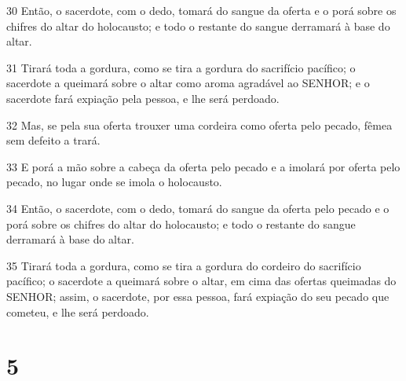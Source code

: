 \par 30 Então, o sacerdote, com o dedo, tomará do sangue da oferta e o porá sobre os chifres do altar do holocausto; e todo o restante do sangue derramará à base do altar.
\par 31 Tirará toda a gordura, como se tira a gordura do sacrifício pacífico; o sacerdote a queimará sobre o altar como aroma agradável ao SENHOR; e o sacerdote fará expiação pela pessoa, e lhe será perdoado.
\par 32 Mas, se pela sua oferta trouxer uma cordeira como oferta pelo pecado, fêmea sem defeito a trará.
\par 33 E porá a mão sobre a cabeça da oferta pelo pecado e a imolará por oferta pelo pecado, no lugar onde se imola o holocausto.
\par 34 Então, o sacerdote, com o dedo, tomará do sangue da oferta pelo pecado e o porá sobre os chifres do altar do holocausto; e todo o restante do sangue derramará à base do altar.
\par 35 Tirará toda a gordura, como se tira a gordura do cordeiro do sacrifício pacífico; o sacerdote a queimará sobre o altar, em cima das ofertas queimadas do SENHOR; assim, o sacerdote, por essa pessoa, fará expiação do seu pecado que cometeu, e lhe será perdoado.

\chapter{5}

